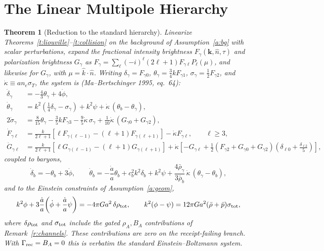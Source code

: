 \documentclass[11pt]{article}
\newtheorem{theorem}{Theorem}[section]
\theoremstyle{remark}
\newcommand{\ah}{\frac{\dot a}{a}}
\newcommand{\kdot}{\dot\kappa}
\begin{document}
\section{The Linear Multipole Hierarchy}\label{s:hierarchy}

\begin{theorem}[Reduction to the standard hierarchy]\label{t:hierarchy}
Linearize Theorems~\ref{t:liouville}--\ref{t:collision} on the background of
Assumption~\ref{a:bg} with scalar perturbations, expand the fractional
intensity brightness $F_\gamma(\mathbf k,\hat n,\tau)$ and polarization
brightness $G_\gamma$ as
$F_\gamma=\sum_\ell(-i)^\ell(2\ell+1)F_{\gamma\ell}P_\ell(\mu)$,
and likewise for $G_\gamma$, with $\mu=\hat k\cdot\hat n$. Writing
$\delta_\gamma=F_{\gamma0}$, $\theta_\gamma=\tfrac34 kF_{\gamma1}$,
$\sigma_\gamma=\tfrac12F_{\gamma2}$, and $\kdot\equiv a n_e\sigma_T$, the
system is (Ma--Bertschinger 1995, eq.~64):
\begin{align*}
\dot\delta_\gamma &= -\tfrac43\theta_\gamma+4\dot\phi,\\
\dot\theta_\gamma &= k^2\!\left(\tfrac14\delta_\gamma-\sigma_\gamma\right)
+k^2\psi+\kdot\,(\theta_b-\theta_\gamma),\\
2\dot\sigma_\gamma &= \tfrac{8}{15}\theta_\gamma-\tfrac35 kF_{\gamma3}
-\tfrac95\kdot\,\sigma_\gamma
+\tfrac{1}{10}\kdot\,(G_{\gamma0}+G_{\gamma2}),\\
\dot F_{\gamma\ell} &= \frac{k}{2\ell+1}\left[\ell F_{\gamma(\ell-1)}
-(\ell+1)F_{\gamma(\ell+1)}\right]-\kdot F_{\gamma\ell},
\qquad \ell\ge3,\\
\dot G_{\gamma\ell} &= \frac{k}{2\ell+1}\left[\ell G_{\gamma(\ell-1)}
-(\ell+1)G_{\gamma(\ell+1)}\right]
+\kdot\left[-G_{\gamma\ell}
+\tfrac12\left(F_{\gamma2}+G_{\gamma0}+G_{\gamma2}\right)
\left(\delta_{\ell0}+\tfrac{\delta_{\ell2}}{5}\right)\right],
\end{align*}
coupled to baryons,
\[
\dot\delta_b=-\theta_b+3\dot\phi,\qquad
\dot\theta_b=-\ah\theta_b+c_b^2k^2\delta_b+k^2\psi
+\frac{4\bar\rho_\gamma}{3\bar\rho_b}\,\kdot\,(\theta_\gamma-\theta_b),
\]
and to the Einstein constraints of Assumption~\ref{a:geom},
\[
k^2\phi+3\ah\!\left(\dot\phi+\ah\psi\right)=-4\pi G a^2\,\delta\rho_{\rm tot},
\qquad
k^2(\phi-\psi)=12\pi G a^2(\bar\rho+\bar p)\sigma_{\rm tot},
\]
where $\delta\rho_{\rm tot}$ and $\sigma_{\rm tot}$ include the gated
$\rho_A,B_A$ contributions of Remark~\ref{r:channels}. These contributions are
zero on the receipt-failing branch. With $\Gamma_{\rm rec}=B_A=0$ this is verbatim the standard
Einstein--Boltzmann system.
\end{theorem}
\end{document}
